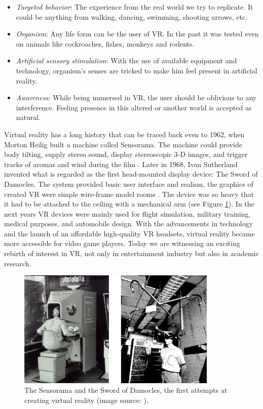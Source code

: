\begin{itemize}
\item \textit{Targeted behavior}: The experience from the real world we try to replicate. It could be anything from walking, dancing, swimming, shooting arrows, etc.
\item \textit{Organism}: Any life form can be the user of VR. In the past it was tested even on animals like cockroaches, fishes, monkeys and rodents.
\item \textit{Artificial sensory stimulation}: With the use of available equipment and technology, organism’s senses are tricked to make him feel present in artificial reality.
\item \textit{Awareness}: While being immersed in VR, the user should be oblivious to any interference. Feeling presence in this altered or another world is accepted as natural.
\end{itemize}

Virtual reality has a long history that can be traced back even to 1962, when Morton Heilig built a machine called Sensorama. The machine could provide body tilting, supply stereo sound, display stereoscopic 3-D images, and trigger tracks of aromas and wind during the film \cite{SENSORAMA}. Later in 1968, Ivan Sutherland invented what is regarded as the first head-mounted display device: The Sword of Damocles. The system provided basic user interface and realism, the graphics of created VR were simple wire-frame model rooms \cite{DAMOCLES}. The device was so heavy that it had to be attached to the ceiling with a mechanical arm (see Figure \ref{fig:FIRST_VR}). In the next years VR devices were mainly used for flight simulation, military training, medical purposes, and automobile design. With the advancements in technology and the launch of an affordable high-quality VR headsets, virtual reality became more accessible for video game players. Today we are witnessing an exciting rebirth of interest in VR, not only in entertainment industry but also in academic research.

\begin{figure}[th]
\centering
\includegraphics[width=0.85\textwidth]{img/first_vr.png}
\caption{The Sensorama and the Sword of Damocles, the first attempts at creating virtual reality (image source: \cite{SENSORAMA_IMAGE}\cite{DAMOCLES}).}
\label{fig:FIRST_VR}
\end{figure}


